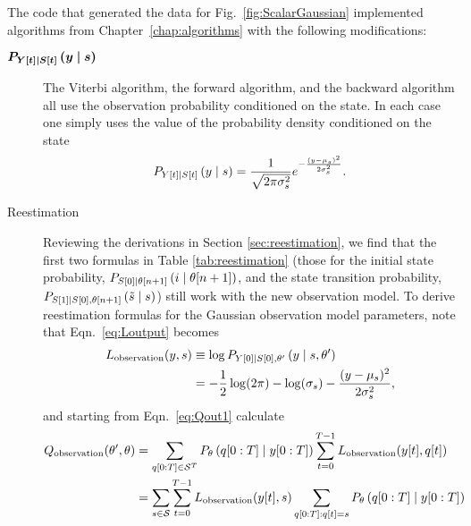 The code that generated the data for Fig.~\ref{fig:ScalarGaussian}
implemented algorithms from Chapter~\ref{chap:algorithms} with the
following modifications:
\begin{description} 
\item[$\bm{P_{{Y}{[t]}\mid {S}{[t]}} \left(y\mid s \right)}$] The Viterbi
  algorithm, the forward algorithm, and the backward algorithm all use
  the observation probability conditioned on the state. In each case one
  simply uses the value of the probability density conditioned on the
  state
  \begin{equation*}
    P_{{Y}{[t]}\mid {S}{[t]}} \left(y\mid s \right) = \frac{1}{\sqrt{2\pi
    \sigma_s^2}} e^{-\frac{(y-\mu_s)^2}{2\sigma_s^2}}.
  \end{equation*}
\newpage%
\item[Reestimation] Reviewing the derivations in Section
  \ref{sec:reestimation}, we find that the first two formulas in Table
  \ref{tab:reestimation} (those for the initial state probability, %
  $P_{{S}{[0]}\mid {\theta}{[n+1]}} \left(i\mid {\theta}{[n+1]} \right)$, 
  and the state transition probability,
  $P_{{S}{[1]}\mid {S}{[0]},{\theta}{[n+1]}} \left({\tilde s}\mid s \right)$) 
  still work with the new observation model.  To derive reestimation
  formulas for the Gaussian observation model parameters, note that
  Eqn.~\eqref{eq:Loutput} becomes %
  \begin{align}
    L_{\text{observation}}(y,s) & \equiv \log
  P_{{Y}{[0]}\mid {S}{[0]},\theta'} \left(y\mid s,\theta' \right)\\
    \label{eq:LoutputG}
    &= -\frac{1}{2} \log (2\pi) - \log(\sigma_s) -
    \frac{(y-\mu_s)^2}{2\sigma_s^2},
  \end{align}
  and starting from Eqn.~\eqref{eq:Qout1} calculate
\begin{align}
  \label{eq:QoutG1}
  Q_{\text{observation}} (\parameters',\parameters) &=
  \sum_{\ts{q}{0}{T}\in\states^T} P_{\parameters}
  \left(\ts{q}{0}{T}\given \ts{y}{0}{T} \right) \sum_{t=0}^{T-1}
  L_{\text{observation}}(\ti{y}{t},\ti{q}{t})\\
  \label{eq:QoutG2}
  &= \sum_{s\in\states} \sum_{t=0}^{T-1} L_{\text{observation}}(\ti{y}{t},s)
  \sum_{\ts{q}{0}{T}:\ti{q}{t}=s }P_{\parameters}
  \left(\ts{q}{0}{T}\given \ts{y}{0}{T} \right) \\

\end{align}
\end{description}

